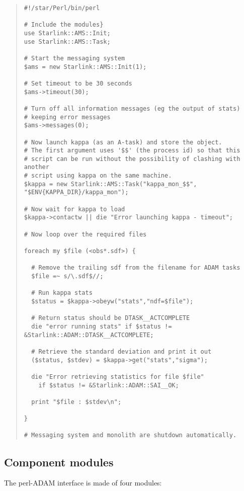 \documentclass[twoside,11pt]{article}
\newenvironment{myquote}{\begin{quote}\begin{small}}{\end{small}\end{quote}}
\renewcommand{\_}{\texttt{\symbol{95}}}
\begin{document}
\begin{myquote}
\begin{verbatim}
#!/star/Perl/bin/perl

# Include the modules}
use Starlink::AMS::Init;
use Starlink::AMS::Task;

# Start the messaging system
$ams = new Starlink::AMS::Init(1);

# Set timeout to be 30 seconds
$ams->timeout(30);

# Turn off all information messages (eg the output of stats)
# keeping error messages
$ams->messages(0);

# Now launch kappa (as an A-task) and store the object.
# The first argument uses '$$' (the process id) so that this
# script can be run without the possibility of clashing with another
# script using kappa on the same machine.
$kappa = new Starlink::AMS::Task("kappa_mon_$$", "$ENV{KAPPA_DIR}/kappa_mon");

# Now wait for kappa to load
$kappa->contactw || die "Error launching kappa - timeout";

# Now loop over the required files

foreach my $file (<obs*.sdf>) {

  # Remove the trailing sdf from the filename for ADAM tasks
  $file =~ s/\.sdf$//;

  # Run kappa stats
  $status = $kappa->obeyw("stats","ndf=$file");

  # Return status should be DTASK__ACTCOMPLETE
  die "error running stats" if $status != &Starlink::ADAM::DTASK__ACTCOMPLETE;

  # Retrieve the standard deviation and print it out
  ($status, $stdev) = $kappa->get("stats","sigma");

  die "Error retrieving statistics for file $file"
    if $status != &Starlink::ADAM::SAI__OK;

  print "$file : $stdev\n";

}

# Messaging system and monolith are shutdown automatically.

\end{verbatim}
\end{myquote}

\subsection{Component modules}

The perl-ADAM interface is made of four modules:
\end{document}
